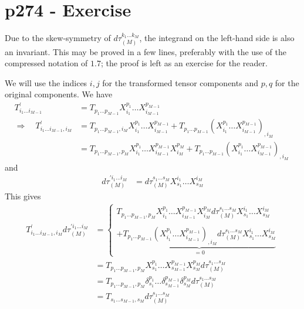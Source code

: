 \section{p274 - Exercise }
\begin{tcolorbox}
Due to the skew-symmetry of $d\tau_{(M)}^{k_1\dots k_M}$, the integrand on the left-hand side is also an invariant. This may be proved in a few lines, preferably with the use of the compressed notation of $1.7$; the proof is left as an exercise for the reader.
\end{tcolorbox}
We will use the indices $i,j$ for the transformed tensor components and $p,q$ for the original components.
We have 
\begin{align}
T^{'}_{i_1 \dots i_{M-1}}&= T^{}_{p_1 \dots p_{M-1}}X^{p_1}_{i_1}\dots X^{p_{M-1}}_{i_{M-1}}\\
\Rightarrow \quad T^{'}_{i_1 \dots i_{M-1},i_M}&= T^{}_{p_1 \dots p_{M-1},i_M}X^{p_1}_{i_1}\dots X^{p_{M-1}}_{i_{M-1}}+T^{}_{p_1 \dots p_{M-1}}\left(X^{p_1}_{i_1}\dots X^{p_{M-1}}_{i_{M-1}}\right)_{,i_M}\\
&= T^{}_{p_1 \dots p_{M-1},p_M}X^{p_1}_{i_1}\dots X^{p_{M-1}}_{i_{M-1}}X^{p_{M}}_{i_{M}}+T^{}_{p_1 \dots p_{M-1}}\left(X^{p_1}_{i_1}\dots X^{p_{M-1}}_{i_{M-1}}\right)_{,i_M}\
\end{align} 
and 
\begin{align}
d\tau_{(M)}^{'i_1 \dots i_{M}}&= d\tau_{(M)}^{s_1 \dots s_{M}}X^{i_1}_{s_1}\dots X^{i_{M}}_{s_{M}}
\end{align}
This gives 
\begin{align}
 T^{'}_{i_1 \dots i_{M-1},i_M}d\tau_{(M)}^{'i_1 \dots i_{M}}&=\left\{\begin{array}{l}T^{}_{p_1 \dots p_{M-1},p_M}X^{p_1}_{i_1}\dots X^{p_{M-1}}_{i_{M-1}}X^{p_{M}}_{i_{M}}d\tau_{(M)}^{s_1 \dots s_{M}}X^{i_1}_{s_1}\dots X^{i_{M}}_{s_{M}}\\\\
 +\underbrace{T^{}_{p_1 \dots p_{M-1}}\left(X^{p_1}_{i_1}\dots X^{p_{M-1}}_{i_{M-1}}\right)_{,i_M}d\tau_{(M)}^{s_1 \dots s_{M}}X^{i_1}_{s_1}\dots X^{i_{M}}_{s_{M}}}_{=0} 
 \end{array}\right.\\
 &=T^{}_{p_1 \dots p_{M-1},p_M}X^{p_1}_{s_1}\dots X^{p_{M-1}}_{s_{M-1}}X^{p_{M}}_{s_{M}}d\tau_{(M)}^{s_1 \dots s_{M}}\\
  &=T^{}_{p_1 \dots p_{M-1},p_M}\delta^{p_1}_{s_1}\dots \delta^{p_{M-1}}_{s_{M-1}}\delta^{p_{M}}_{s_{M}}d\tau_{(M)}^{s_1 \dots s_{M}}\\
   &=T^{}_{s_1 \dots s_{M-1},s_M}d\tau_{(M)}^{s_1 \dots s_{M}}
\end{align}
